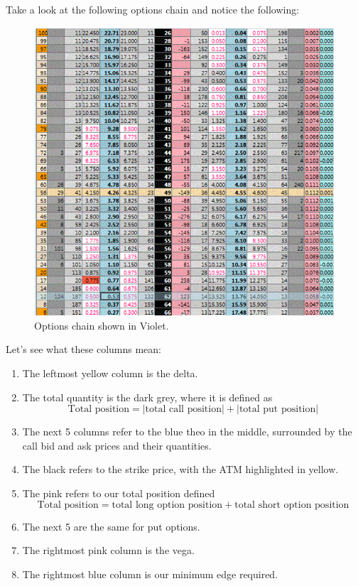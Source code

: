 \documentclass{article}
\begin{document}
    Take a look at the following options chain and notice the following: 

    \begin{figure}[H]
      \centering 
       \includegraphics[scale=0.4]{img/violet.png}
      \caption{Options chain shown in Violet. } 
      \label{fig:violet}
    \end{figure}

    Let's see what these columns mean: 
    \begin{enumerate}
      \item The leftmost yellow column is the delta. 
      \item The total quantity is the dark grey, where it is defined as 
        \begin{equation}
          \text{Total position} = |\text{total call position}| + |\text{total put position}|
        \end{equation}
      \item The next 5 columns refer to the blue theo in the middle, surrounded by the call bid and ask prices and their quantities. 
      \item The black refers to the strike price, with the ATM highlighted in yellow. 
      \item The pink refers to our total position defined 
        \begin{equation}
          \text{Total position} = \text{total long option position} + \text{total short option position}
        \end{equation}
      \item The next 5 are the same for put options. 
      \item The rightmost pink column is the vega. 
      \item The rightmost blue column is our minimum edge required. 
    \end{enumerate}
\end{document}
